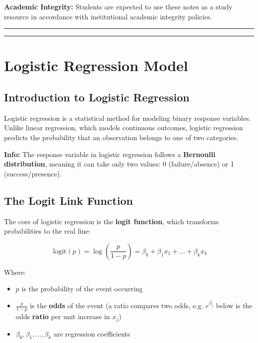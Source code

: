 \documentclass[
]{article}
\begin{document}
\textbf{Academic Integrity:} Students are expected to use these notes as
a study resource in accordance with institutional academic integrity
policies.

\begin{center}\rule{0.5\linewidth}{0.5pt}\end{center}

\begin{center}\rule{0.5\linewidth}{0.5pt}\end{center}

\textbf{ }

\section{Logistic Regression Model}

\textbf{ }

\subsection{Introduction to Logistic Regression}

Logistic regression is a statistical method for modeling binary response
variables. Unlike linear regression, which models continuous outcomes,
logistic regression predicts the probability that an observation belongs
to one of two categories.

\textbf{Info: } The response variable in logistic regression follows a
\textbf{Bernoulli distribution}, meaning it can take only two values: 0
(failure/absence) or 1 (success/presence).

\textbf{ }

\subsection{The Logit Link Function}

The core of logistic regression is the \textbf{logit function}, which
transforms probabilities to the real line:

\[\text{ logit}(p) = \log(\frac{p}{1 - p}) = \beta_{0} + \beta_{1}x_{1} + \ldots + \beta_{k}x_{k}\]

Where:

\begin{itemize}
\item
  \(p\) is the probability of the event occurring
\item
  \(\frac{p}{1 - p}\) is the \textbf{odds} of the event (a ratio
  compares two odds, e.g. \(e^{\beta_{j}}\) below is the odds
  \textbf{ratio} per unit increase in \(x_{j}\))
\item
  \(\beta_{0},\beta_{1},\ldots,\beta_{k}\) are regression coefficients
\end{itemize}
\end{document}
